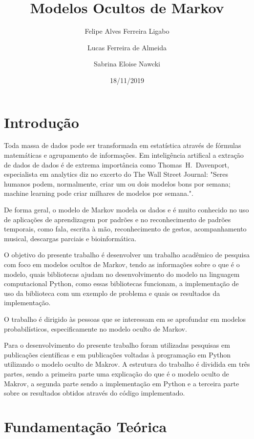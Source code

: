 \documentclass{article}
\title{Modelos Ocultos de Markov}
\author{
Felipe Alves Ferreira Ligabo\\
\and
Lucas Ferreira de Almeida\\
\and
Sabrina Eloise Nawcki\\
}
\date{18/11/2019}
\begin{document}
\maketitle

\tableofcontents
\listoffigures

\section{Introdução}

Toda massa de dados pode ser transformada em estatística através de fórmulas matemáticas e agrupamento de informações. Em inteligência artifical a extração de dados de dados é de extrema importância como \mbox{Thomas H. Davenport}, especialista em analytics diz no excerto do The Wall Street Journal: "Seres humanos podem, normalmente, criar um ou dois modelos bons por semana; machine learning pode criar milhares de modelos por semana.".

De forma geral, o modelo de Markov modela os dados e é muito conhecido no uso de aplicações de aprendizagem por padrões e no reconhecimento de padrões temporais, como fala, escrita à mão, reconhecimento de gestos, acompanhamento musical, descargas parciais e bioinformática. 

O objetivo do presente trabalho é desenvolver um trabalho acadêmico de pesquisa com foco em modelos ocultos de Markov, tendo as informações sobre o que é o modelo, quais bibliotecas ajudam no desenvolvimento do modelo na linguagem computacional Python, como essas bibliotecas funcionam, a implementação de uso da biblioteca com um exemplo de problema e quais os resultados da implementação. 

O trabalho é dirigido às pessoas que se interessam em se aprofundar em modelos probabilísticos, especificamente no modelo oculto de Markov. 

Para o desenvolvimento do presente trabalho foram utilizadas pesquisas em publicações científicas e em publicações voltadas à programação em Python utilizando o modelo oculto de Makrov.
A estrutura do trabalho é dividida em três partes, sendo a primeira parte uma explicação do que é o modelo oculto de Makrov, a segunda parte sendo a implementação em Python e a terceira parte sobre os resultados obtidos através do código implementado. 

\section{Fundamentação Teórica}
\end{document}
